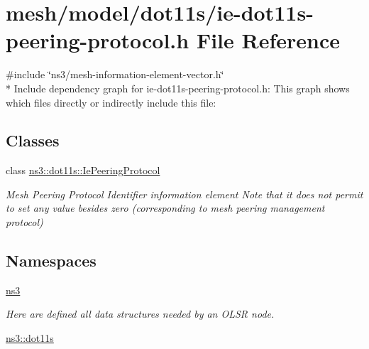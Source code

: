 \hypertarget{ie-dot11s-peering-protocol_8h}{}\section{mesh/model/dot11s/ie-\/dot11s-\/peering-\/protocol.h File Reference}
\label{ie-dot11s-peering-protocol_8h}
{\ttfamily \#include \char`\"{}ns3/mesh-\/information-\/element-\/vector.\+h\char`\"{}}\\*
Include dependency graph for ie-\/dot11s-\/peering-\/protocol.h\+:
This graph shows which files directly or indirectly include this file\+:
\subsection*{Classes}
\begin{DoxyCompactItemize}
\item 
class \hyperlink{classns3_1_1dot11s_1_1IePeeringProtocol}{ns3\+::dot11s\+::\+Ie\+Peering\+Protocol}
\begin{DoxyCompactList}\small\item\em Mesh Peering Protocol Identifier information element Note that it does not permit to set any value besides zero (corresponding to mesh peering management protocol) \end{DoxyCompactList}\end{DoxyCompactItemize}
\subsection*{Namespaces}
\begin{DoxyCompactItemize}
\item 
 \hyperlink{namespacens3}{ns3}
\begin{DoxyCompactList}\small\item\em Here are defined all data structures needed by an O\+L\+SR node. \end{DoxyCompactList}\item 
 \hyperlink{namespacens3_1_1dot11s}{ns3\+::dot11s}
\end{DoxyCompactItemize}
